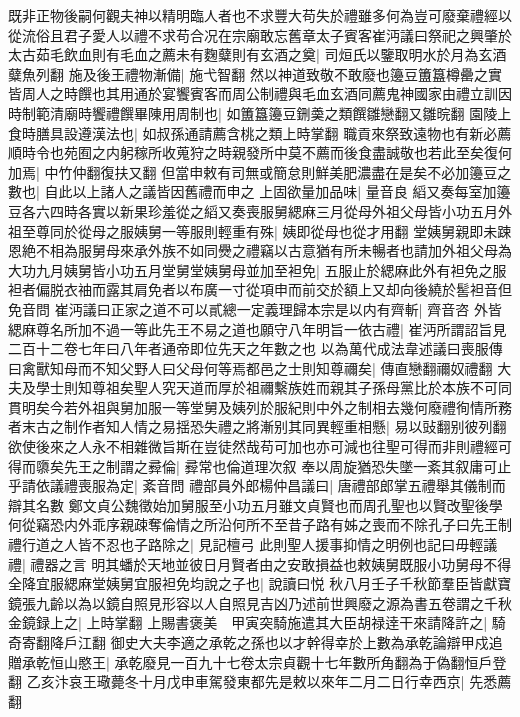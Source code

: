 既非正物後嗣何觀夫神以精明臨人者也不求豐大苟失於禮雖多何為豈可廢棄禮經以從流俗且君子愛人以禮不求苟合况在宗廟敢忘舊章太子賓客崔沔議曰祭祀之興肇於太古茹毛飲血則有毛血之薦未有麴糵則有玄酒之奠|{
	司烜氏以鑒取明水於月為玄酒糵魚列翻}
施及後王禮物漸備|{
	施弋智翻}
然以神道致敬不敢廢也籩豆簠簋樽罍之實皆周人之時饌也其用通於宴饗賓客而周公制禮與毛血玄酒同薦鬼神國家由禮立訓因時制範清廟時饗禮饌畢陳用周制也|{
	如簠簋籩豆鉶羮之類饌雛戀翻又雛晥翻}
園陵上食時膳具設遵漢法也|{
	如叔孫通請薦含桃之類上時掌翻}
職貢來祭致遠物也有新必薦順時令也苑囿之内躬稼所收蒐狩之時親發所中莫不薦而後食盡誠敬也若此至矣復何加焉|{
	中竹仲翻復扶又翻}
但當申敕有司無或簡怠則鮮美肥濃盡在是矣不必加籩豆之數也|{
	自此以上諸人之議皆因舊禮而申之}
上固欲量加品味|{
	量音良}
縚又奏每室加籩豆各六四時各實以新果珍羞從之縚又奏喪服舅緦麻三月從母外祖父母皆小功五月外祖至尊同於從母之服姨舅一等服則輕重有殊|{
	姨即從母也從才用翻}
堂姨舅親即未踈恩絶不相為服舅母來承外族不如同㸑之禮竊以古意猶有所未暢者也請加外祖父母為大功九月姨舅皆小功五月堂舅堂姨舅母並加至袒免|{
	五服止於緦麻此外有袒免之服袒者偏脱衣䄂而露其肩免者以布廣一寸從項申而前交於額上又却向後繞於䯻袒音但免音問}
崔沔議曰正家之道不可以貳總一定義理歸本宗是以内有齊斬|{
	齊音咨}
外皆緦麻尊名所加不過一等此先王不易之道也願守八年明旨一依古禮|{
	崔沔所謂詔旨見二百十二卷七年曰八年者通帝即位先天之年數之也}
以為萬代成法韋述議曰喪服傳曰禽獸知母而不知父野人曰父母何等焉都邑之士則知尊禰矣|{
	傳直戀翻禰奴禮翻}
大夫及學士則知尊祖矣聖人究天道而厚於祖禰繫族姓而親其子孫母黨比於本族不可同貫明矣今若外祖與舅加服一等堂舅及姨列於服紀則中外之制相去幾何廢禮徇情所務者末古之制作者知人情之易揺恐失禮之將漸别其同異輕重相懸|{
	易以䜴翻别彼列翻}
欲使後來之人永不相雜微旨斯在豈徒然哉苟可加也亦可減也往聖可得而非則禮經可得而隳矣先王之制謂之彛倫|{
	彛常也倫道理次叙}
奉以周旋猶恐失墜一紊其叙庸可止乎請依議禮喪服為定|{
	紊音問}
禮部員外郎楊仲昌議曰|{
	唐禮部郎掌五禮舉其儀制而辯其名數}
鄭文貞公魏徵始加舅服至小功五月雖文貞賢也而周孔聖也以賢改聖後學何從竊恐内外乖序親疎奪倫情之所沿何所不至昔子路有姊之喪而不除孔子曰先王制禮行道之人皆不忍也子路除之|{
	見記檀弓}
此則聖人援事抑情之明例也記曰毋輕議禮|{
	禮器之言}
明其蟠於天地並彼日月賢者由之安敢損益也敕姨舅既服小功舅母不得全降宜服緦麻堂姨舅宜服袒免均說之子也|{
	說讀曰悦}
秋八月壬子千秋節羣臣皆獻寶鏡張九齡以為以鏡自照見形容以人自照見吉凶乃述前世興廢之源為書五卷謂之千秋金鏡録上之|{
	上時掌翻}
上賜書褒美　甲寅突騎施遣其大臣胡禄逹干來請降許之|{
	騎奇寄翻降戶江翻}
御史大夫李適之承乾之孫也以才幹得幸於上數為承乾論辯甲戍追贈承乾恒山愍王|{
	承乾廢見一百九十七卷太宗貞觀十七年數所角翻為于偽翻恒戶登翻}
乙亥汴哀王璥薨冬十月戊申車駕發東都先是敕以來年二月二日行幸西京|{
	先悉薦翻}
